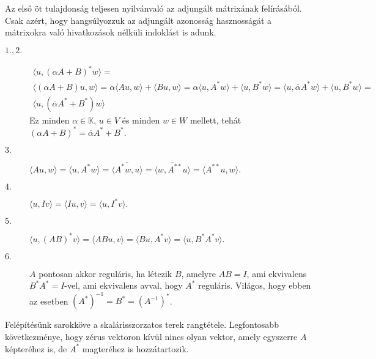 \documentclass[a4paper, showtrims]{memoir}
\makeatletter
\renewenvironment{proof}[1][\proofname]
    {\par\pushQED{\qed}%
    \normalfont \topsep6\p@\@plus6\p@\relax
    \trivlist
    \item[\hskip\labelsep
        \itshape
    #1\@addpunct{:}]\ignorespaces}
    {\popQED\endtrivlist\@endpefalse}
\theoremstyle{plain}
\theoremstyle{remark}
\theoremstyle{definition}
\newcommand{\ip}[2]{\langle#1,#2\rangle}
\makeatother
\begin{document}
\begin{proof}
	Az első öt tulajdonság teljesen nyilvánvaló az adjungált mátrixának felírásából.
	Csak azért, hogy hangsúlyozzuk az adjungált azonosság hasznosságát a mátrixokra való hivatkozások nélküli indoklást is adunk.
	\begin{description}
		\item[$1., 2.$ ]
		      \begin{multline*}
			      \ip{u}{(\alpha A+B)^\ast w}
			      =\\
			      \ip{\left( \alpha A+B \right)u}{w}
			      =
			      \alpha\ip{Au}{w}+\ip{Bu}{w}
			      =
			      \alpha\ip{u}{A^\ast w}+\ip{u}{B^\ast w}
			      =
			      \ip{u}{\overline{\alpha}A^\ast w}+\ip{u}{B^\ast w}
			      =\\
			      \ip{u}{\left( \overline{\alpha}A^\ast +B^\ast \right)w}
		      \end{multline*}
		      Ez minden $\alpha\in\mathbb{K}$, $u\in V$ és minden $w\in W$ mellett, tehát
		      \begin{math}
			      \left( \alpha A+B \right)^\ast=\overline{\alpha}A^\ast+B^\ast.
		      \end{math}
		\item[$3.$]
		      \(
		      \ip{Au}{w}
		      =
		      \ip{u}{A^\ast w}
		      =
		      \overline{
			      \ip{A^\ast w}{u}
		      }
		      =
		      \overline{
			      \ip{w}{A^{\ast\ast} u}
		      }
		      =
		      \ip{A^{\ast\ast} u}{w}.
		      \)
		\item[$4.$]
		      \(
		      \ip{u}{Iv}
		      =
		      \ip{Iu}{v}
		      =
		      \ip{u}{I^\ast v}.
		      \)
		\item[$5.$]
		      \begin{math}
			      \ip{u}{\left( AB \right)^\ast v}
			      =
			      \ip{ABu}{v}
			      =
			      \ip{Bu}{A^\ast v}
			      =
			      \ip{u}{B^\ast A^\ast v}.
		      \end{math}
		\item[$6.$] $A$ pontosan akkor reguláris, ha létezik $B$, amelyre $AB=I$, ami ekvivalens $B^\ast A^\ast=I$-vel,
		      ami ekvivalens avval, hogy $A^\ast$ reguláris.
		      Világos, hogy ebben az esetben $\left( A^\ast \right)^{-1}=B^\ast=\left( A^{-1} \right)^\ast$.
		      \qedhere
	\end{description}
\end{proof}
Felépítésünk sarokköve a skalárisszorzatos terek rangtétele.
Legfontosabb következménye, hogy zérus vektoron kívül nincs olyan vektor,
amely egyszerre $A$ képteréhez is, de $A^\ast$ magteréhez is hozzátartozik.
\end{document}
